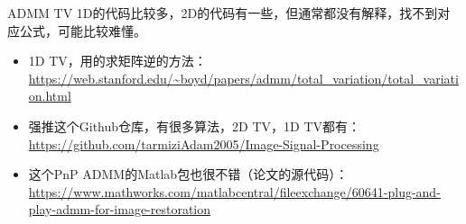 \documentclass[10pt]{report}
\begin{document}
ADMM TV 1D的代码比较多，2D的代码有一些，但通常都没有解释，找不到对应公式，可能比较难懂。

\begin{itemize}
	\item 1D TV，用的求矩阵逆的方法：\url{https://web.stanford.edu/~boyd/papers/admm/total_variation/total_variation.html}
	\item 强推这个Github仓库，有很多算法，2D TV，1D TV都有：\url{https://github.com/tarmiziAdam2005/Image-Signal-Processing}
	\item 这个PnP ADMM的Matlab包也很不错（论文\cite{chan2016plugandplay}的源代码）：\url{https://www.mathworks.com/matlabcentral/fileexchange/60641-plug-and-play-admm-for-image-restoration}
\end{itemize}

\printbibliography
\end{document}

